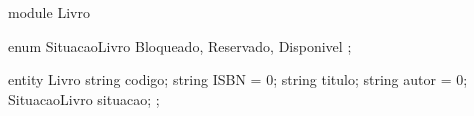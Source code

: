 module Livro {
   enum SituacaoLivro { Bloqueado, Reservado, Disponivel }; 
 
   entity Livro {
     string codigo;
     string ISBN = 0; 
     string titulo;
     string autor = 0;
     SituacaoLivro situacao;
   }; 
}
